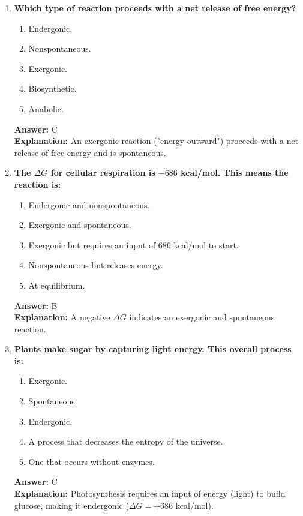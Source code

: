 \documentclass[11pt, a4paper]{article}
\begin{document}
\begin{enumerate}[leftmargin=*, label=\arabic*.]
\item \textbf{Which type of reaction proceeds with a net release of free energy?}
\begin{enumerate}[label=\Alph*.]
    \item Endergonic.
    \item Nonspontaneous.
    \item Exergonic.
    \item Biosynthetic.
    \item Anabolic.
\end{enumerate}
\textbf{Answer:} C \\
\textbf{Explanation:} An exergonic reaction ("energy outward") proceeds with a net release of free energy and is spontaneous.

\item \textbf{The $\Delta G$ for cellular respiration is $-686$ kcal/mol. This means the reaction is:}
\begin{enumerate}[label=\Alph*.]
    \item Endergonic and nonspontaneous.
    \item Exergonic and spontaneous.
    \item Exergonic but requires an input of 686 kcal/mol to start.
    \item Nonspontaneous but releases energy.
    \item At equilibrium.
\end{enumerate}
\textbf{Answer:} B \\
\textbf{Explanation:} A negative $\Delta G$ indicates an exergonic and spontaneous reaction.

\item \textbf{Plants make sugar by capturing light energy. This overall process is:}
\begin{enumerate}[label=\Alph*.]
    \item Exergonic.
    \item Spontaneous.
    \item Endergonic.
    \item A process that decreases the entropy of the universe.
    \item One that occurs without enzymes.
\end{enumerate}
\textbf{Answer:} C \\
\textbf{Explanation:} Photosynthesis requires an input of energy (light) to build glucose, making it endergonic ($\Delta G = +686$ kcal/mol).


\end{enumerate}
\end{document}
